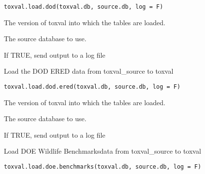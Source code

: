\documentclass[letterpaper]{book}
\begin{document}
%
\begin{Usage}
\begin{verbatim}
toxval.load.dod(toxval.db, source.db, log = F)
\end{verbatim}
\end{Usage}
%
\begin{Arguments}
\begin{ldescription}
\item[\code{toxval.db}] The version of toxval into which the tables are loaded.

\item[\code{source.db}] The source database to use.

\item[\code{log}] If TRUE, send output to a log file
\end{ldescription}
\end{Arguments}
%
\begin{Description}\relax
Load the DOD ERED data from toxval\_source to toxval
\end{Description}
%
\begin{Usage}
\begin{verbatim}
toxval.load.dod.ered(toxval.db, source.db, log = F)
\end{verbatim}
\end{Usage}
%
\begin{Arguments}
\begin{ldescription}
\item[\code{toxval.db}] The version of toxval into which the tables are loaded.

\item[\code{source.db}] The source database to use.

\item[\code{log}] If TRUE, send output to a log file
\end{ldescription}
\end{Arguments}
%
\begin{Description}\relax
Load DOE Wildlife Benchmarksdata from toxval\_source to toxval
\end{Description}
%
\begin{Usage}
\begin{verbatim}
toxval.load.doe.benchmarks(toxval.db, source.db, log = F)
\end{verbatim}
\end{Usage}
\end{document}

